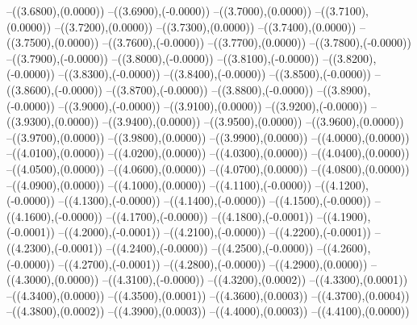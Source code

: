 {	--({\sx*(3.6800)},{\sy*(0.0000)})
	--({\sx*(3.6900)},{\sy*(-0.0000)})
	--({\sx*(3.7000)},{\sy*(0.0000)})
	--({\sx*(3.7100)},{\sy*(0.0000)})
	--({\sx*(3.7200)},{\sy*(0.0000)})
	--({\sx*(3.7300)},{\sy*(0.0000)})
	--({\sx*(3.7400)},{\sy*(0.0000)})
	--({\sx*(3.7500)},{\sy*(0.0000)})
	--({\sx*(3.7600)},{\sy*(-0.0000)})
	--({\sx*(3.7700)},{\sy*(0.0000)})
	--({\sx*(3.7800)},{\sy*(-0.0000)})
	--({\sx*(3.7900)},{\sy*(-0.0000)})
	--({\sx*(3.8000)},{\sy*(-0.0000)})
	--({\sx*(3.8100)},{\sy*(-0.0000)})
	--({\sx*(3.8200)},{\sy*(-0.0000)})
	--({\sx*(3.8300)},{\sy*(-0.0000)})
	--({\sx*(3.8400)},{\sy*(-0.0000)})
	--({\sx*(3.8500)},{\sy*(-0.0000)})
	--({\sx*(3.8600)},{\sy*(-0.0000)})
	--({\sx*(3.8700)},{\sy*(-0.0000)})
	--({\sx*(3.8800)},{\sy*(-0.0000)})
	--({\sx*(3.8900)},{\sy*(-0.0000)})
	--({\sx*(3.9000)},{\sy*(-0.0000)})
	--({\sx*(3.9100)},{\sy*(0.0000)})
	--({\sx*(3.9200)},{\sy*(-0.0000)})
	--({\sx*(3.9300)},{\sy*(0.0000)})
	--({\sx*(3.9400)},{\sy*(0.0000)})
	--({\sx*(3.9500)},{\sy*(0.0000)})
	--({\sx*(3.9600)},{\sy*(0.0000)})
	--({\sx*(3.9700)},{\sy*(0.0000)})
	--({\sx*(3.9800)},{\sy*(0.0000)})
	--({\sx*(3.9900)},{\sy*(0.0000)})
	--({\sx*(4.0000)},{\sy*(0.0000)})
	--({\sx*(4.0100)},{\sy*(0.0000)})
	--({\sx*(4.0200)},{\sy*(0.0000)})
	--({\sx*(4.0300)},{\sy*(0.0000)})
	--({\sx*(4.0400)},{\sy*(0.0000)})
	--({\sx*(4.0500)},{\sy*(0.0000)})
	--({\sx*(4.0600)},{\sy*(0.0000)})
	--({\sx*(4.0700)},{\sy*(0.0000)})
	--({\sx*(4.0800)},{\sy*(0.0000)})
	--({\sx*(4.0900)},{\sy*(0.0000)})
	--({\sx*(4.1000)},{\sy*(0.0000)})
	--({\sx*(4.1100)},{\sy*(-0.0000)})
	--({\sx*(4.1200)},{\sy*(-0.0000)})
	--({\sx*(4.1300)},{\sy*(-0.0000)})
	--({\sx*(4.1400)},{\sy*(-0.0000)})
	--({\sx*(4.1500)},{\sy*(-0.0000)})
	--({\sx*(4.1600)},{\sy*(-0.0000)})
	--({\sx*(4.1700)},{\sy*(-0.0000)})
	--({\sx*(4.1800)},{\sy*(-0.0001)})
	--({\sx*(4.1900)},{\sy*(-0.0001)})
	--({\sx*(4.2000)},{\sy*(-0.0001)})
	--({\sx*(4.2100)},{\sy*(-0.0000)})
	--({\sx*(4.2200)},{\sy*(-0.0001)})
	--({\sx*(4.2300)},{\sy*(-0.0001)})
	--({\sx*(4.2400)},{\sy*(-0.0000)})
	--({\sx*(4.2500)},{\sy*(-0.0000)})
	--({\sx*(4.2600)},{\sy*(-0.0000)})
	--({\sx*(4.2700)},{\sy*(-0.0001)})
	--({\sx*(4.2800)},{\sy*(-0.0000)})
	--({\sx*(4.2900)},{\sy*(0.0000)})
	--({\sx*(4.3000)},{\sy*(0.0000)})
	--({\sx*(4.3100)},{\sy*(-0.0000)})
	--({\sx*(4.3200)},{\sy*(0.0002)})
	--({\sx*(4.3300)},{\sy*(0.0001)})
	--({\sx*(4.3400)},{\sy*(0.0000)})
	--({\sx*(4.3500)},{\sy*(0.0001)})
	--({\sx*(4.3600)},{\sy*(0.0003)})
	--({\sx*(4.3700)},{\sy*(0.0004)})
	--({\sx*(4.3800)},{\sy*(0.0002)})
	--({\sx*(4.3900)},{\sy*(0.0003)})
	--({\sx*(4.4000)},{\sy*(0.0003)})
	--({\sx*(4.4100)},{\sy*(0.0000)})
}
